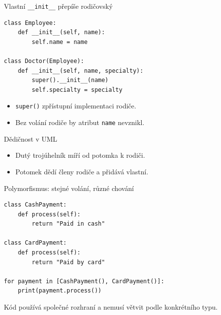 \documentclass[aspectratio=169]{beamer}
\begin{document}
\begin{frame}[fragile]{Vlastní \texttt{\_\_init\_\_} přepíše rodičovský}
\begin{lstlisting}[style=python]
class Employee:
    def __init__(self, name):
        self.name = name

class Doctor(Employee):
    def __init__(self, name, specialty):
        super().__init__(name)
        self.specialty = specialty
\end{lstlisting}
  \begin{itemize}
    \item \texttt{super()} zpřístupní implementaci rodiče.
    \item Bez volání rodiče by atribut \texttt{name} nevznikl.
  \end{itemize}
\end{frame}

\begin{frame}{Dědičnost v UML}
  \centering
  \begin{itemize}
    \item Dutý trojúhelník míří od potomka k rodiči.
    \item Potomek dědí členy rodiče a přidává vlastní.
  \end{itemize}
\end{frame}

\begin{frame}[fragile]{Polymorfismus: stejné volání, různé chování}
\begin{lstlisting}[style=python,basicstyle=\ttfamily\normalsize]
class CashPayment:
    def process(self):
        return "Paid in cash"

class CardPayment:
    def process(self):
        return "Paid by card"

for payment in [CashPayment(), CardPayment()]:
    print(payment.process())
\end{lstlisting}
  Kód používá společné rozhraní a nemusí větvit podle konkrétního typu.
\end{frame}
\end{document}
